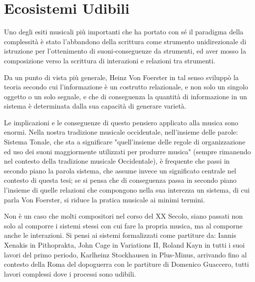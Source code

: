 
\section{Ecosistemi Udibili}
\label{sec:Ecosistemi Udibili}

Uno degli esiti musicali più importanti che ha portato con sé il paradigma della complessità è stato l'abbandono della scrittura come strumento unidirezionale di istruzione per l'ottenimento di suoni-conseguenze da strumenti, ed aver mosso la composizione verso la scrittura di interazioni e relazioni tra  strumenti.

Da un punto di vista più generale, Heinz Von Foerster in tal senso 
sviluppò la teoria %
secondo cui l'informazione è un costrutto relazionale, 
e non solo un singolo oggetto o un solo segnale, 
e che di conseguenza la quantità di informazione in un sistema è determinata %
dalla sua capacità di generare varietà.

Le implicazioni e le conseguenze di questo pensiero applicato alla musica sono enormi.
Nella nostra tradizione musicale occidentale, nell'insieme delle parole: Sistema Tonale, 
che sta a significare "quell'insieme delle regole di organizzazione ed uso dei
suoni maggiormente utilizzati per produrre musica" 
(sempre rimanendo nel contesto della tradizione musicale Occidentale), 
è frequente che passi in secondo piano la parola 
sistema, che assume invece un significato centrale nel contesto di questa tesi;
se si pensa che di conseguenza passa in secondo piano l'insieme di quelle relazioni
che compongono nella sua interezza un sistema, di cui parla Von Foerster, 
si riduce la pratica musicale ai minimi termini.

Non è un caso che molti compositori nel corso del XX Secolo, siano passati non solo al comporre 
i sistemi stessi con cui fare la propria musica, ma al comporne anche le interazioni.
Si pensi ai sistemi formalizzati come partiture da: Iannis Xenakis in Pithoprakta, John Cage in Variations II, 
Roland Kayn in tutti i suoi lavori del primo periodo, Karlheinz Stockhausen in Plus-Minus, 
arrivando fino al contesto della Roma del dopoguerra con le partiture di Domenico Guaccero,
tutti lavori complessi dove i processi sono udibili.

